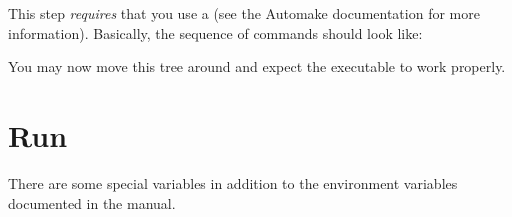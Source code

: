 This step \emph{requires} that you use a  (see the Automake
documentation for more information).  Basically, the sequence of commands
should look like:


You may now move this tree around and expect the executable to work
properly.

\section{Run}

There are some special variables in addition to the environment
variables documented in the manual.

